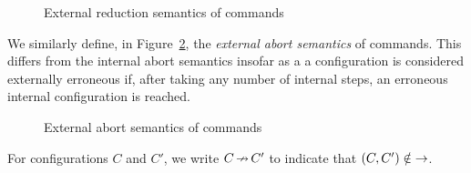 \documentclass[11pt]{report}
\begin{document}
\begin{figure}[h]
	\centering

	
	\vspace{1em}

	
	\vspace{1em}

	
	\vspace{1em}

	\caption{External reduction semantics of commands}
	\label{fig:comm-ext-red-rel}
\end{figure}

We similarly define, in Figure~\ref{fig:comm-ext-abort-rel}, the \emph{external abort semantics} of commands. This differs from the internal abort semantics insofar as a a configuration is considered externally erroneous if, after taking any number of internal steps, an erroneous internal configuration is reached. 

\begin{figure}[h]
	\centering

	
	\vspace{1em}

	
	\vspace{1em}

	
	\vspace{1em}

	\caption{External abort semantics of commands}
	\label{fig:comm-ext-abort-rel}
\end{figure}

For configurations $C$ and $C'$, we write $C \operatorname{\nrightarrow} C'$ to indicate that $(C,C') \notin \operatorname{\rightarrow}$. 

\end{document}
